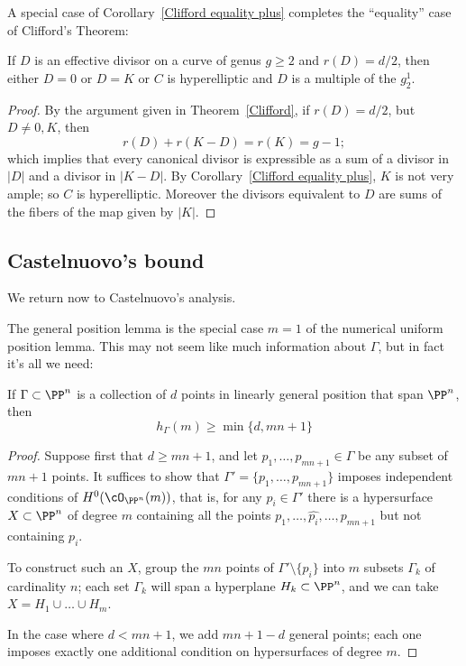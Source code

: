 A special case of Corollary~\ref{Clifford equality plus} completes the ``equality'' case of Clifford's Theorem:

\begin{corollary}\label{Clifford equality}
If $D$ is an effective divisor on a curve of genus $g\geq 2$ and $r(D) = d/2$, then either $D= 0$ or 
$D=K$ or $C$ is hyperelliptic and $D$ is a multiple of the $g^1_2$.
\end{corollary}

\begin{proof}
  By the argument given in Theorem~\ref{Clifford}, if $r(D) = d/2$, but $D\neq 0,K$, then
$$
r(D) + r(K-D) = r(K) = g-1;
$$
which implies that every canonical divisor is expressible as a sum of a divisor in $|D|$ and a divisor in $|K-D|$.
By Corollary~\ref{Clifford equality plus}, $K$ is not very ample; so $C$ is hyperelliptic. Moreover the
divisors equivalent to $D$ are sums of the fibers of the map given by $|K|$.
\end{proof}

\subsection{Castelnuovo's bound}

We return now to Castelnuovo's analysis.

The general position lemma is the special case $m=1$ of the numerical uniform position lemma. This may not seem like much information about $\Gamma$, but in fact it's all we need:

\begin{proposition}\label{min hilb}
If $\Gamma \subset \PP^n$ is a collection of $d$ points in linearly general position that span $\PP^n$, then 
$$
h_\Gamma(m) \geq \min\{d, mn+1\}
$$
\end{proposition}

\begin{proof}
Suppose first that $d \geq mn+1$, and let $p_1,\dots,p_{mn+1} \in \Gamma$ be any subset of $mn+1$ points. It suffices to show that $\Gamma' = \{p_1,\dots,p_{mn+1}\}$ imposes independent conditions of $H^0(\cO_{\PP^n}(m))$, that is, for any $p_i \in \Gamma'$ there is a hypersurface $X \subset \PP^n$ of degree $m$ containing all the points $p_1,\dots, \hat{p_i},\dots,p_{mn+1}$ but not containing $p_i$.

To construct such an $X$, group the $mn$ points of $\Gamma' \setminus \{p_i\}$ into $m$ subsets $\Gamma_k$ of cardinality $n$; each set $\Gamma_k$ will span a hyperplane $H_k \subset \PP^n$, and we can take $X = H_1 \cup \dots \cup H_m$. 

In the case where $d<mn+1$, we add $mn+1-d$ general points; each one imposes exactly one
additional condition on hypersurfaces of degree $m$.
\end{proof}

